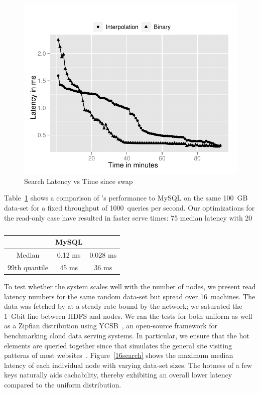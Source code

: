 \begin{figure}
  \centering
    \includegraphics[scale=0.55]{images/search_1node.pdf}
  \caption{Search Latency vs Time since swap}
  \label{search}
\end{figure}

Table~\ref{mysql:search} shows a comparison of \projectname's
performance to MySQL on the same 100~GB data-set for a fixed
throughput of 1000~queries per second. Our optimizations for the
read-only case have resulted in faster serve times: 75%
median latency with 20%

\begin{table}
\centering
\begin{tabular}{ | c | c | c |  }
\hline
                & MySQL   & \projectname{} \\ \hline
Median          & 0.12 ms & 0.028 ms       \\
99th quantile	& 45 ms   & 36 ms          \\
\hline
\end{tabular}
\caption{}
\label{mysql:search}
\end{table}

To test whether the system scales well with the number of nodes, we
present read latency numbers for the same random data-set but spread
over 16~machines. The data was fetched by \projectname{} at a steady
rate bound by the network; we saturated the 1~Gbit line between HDFS
and \projectname{} nodes. We ran the tests for both uniform as well as
a Zipfian distribution using YCSB~\cite{ycsb}, an open-source framework 
for benchmarking cloud data serving systems. In particular,
 we ensure that the hot elements are queried together since that 
simulates the general site visiting patterns of most websites~\cite{zipf}.
Figure~\ref{16search} shows the maximum median latency of each
individual node with varying data-set sizes. The hotness of a few keys
naturally aids cachability, thereby exhibiting an overall lower
latency compared to the uniform distribution. 


